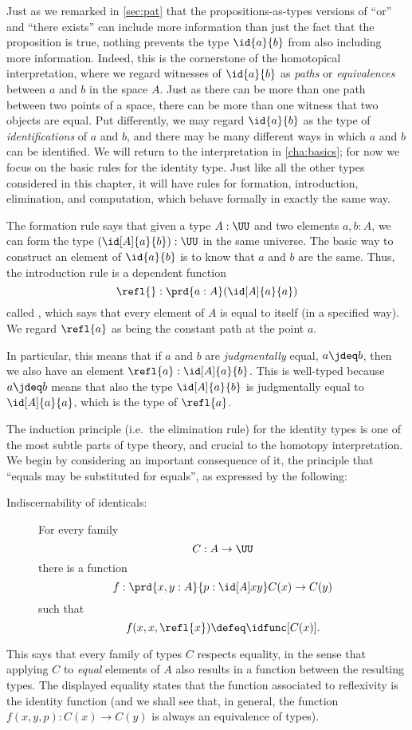 Just as we remarked in \cref{sec:pat} that the propositions-as-types versions of ``or'' and ``there exists'' can include more information than just the fact that the proposition is true, nothing prevents  the type $\id{a}{b}$ from also including more information.
Indeed, this is the cornerstone of the homotopical interpretation, where we regard witnesses of $\id{a}{b}$ as \emph{paths} or \emph{equivalences} between $a$ and $b$ in the space $A$.  Just as there can be more than one path between two points of a space, there can be more than one witness that two objects are equal.  Put differently, we may regard $\id{a}{b}$ as the type of \emph{identifications} of $a$ and $b$, and there may be many different ways in which $a$ and $b$ can be identified.
We will return to the interpretation in \cref{cha:basics}; for now we focus on the basic rules for the identity type.
Just like all the other types considered in this chapter, it will have rules for formation, introduction, elimination, and computation, which behave formally in exactly the same way.

The formation rule says that given a type $A:\UU$ and two elements $a,b:A$, we can form the type $(\id[A]{a}{b}):\UU$ in the same universe.
The basic way to construct an element of $\id{a}{b}$ is to know that $a$ and $b$ are the same.
Thus, the introduction rule is a dependent function
\[\refl{} : \prd{a:A} (\id[A]{a}{a})\]
called ,
%
which says that every element of $A$ is equal to itself (in a specified way).  We regard $\refl{a}$ as being the
constant path
at the point $a$.

In particular, this means that if $a$ and $b$ are \emph{judgmentally} equal, $a\jdeq b$, then we also have an element $\refl{a} : \id[A]{a}{b}$.
This is well-typed because $a\jdeq b$ means that also the type $\id[A]{a}{b}$ is judgmentally equal to $\id[A]{a}{a}$, which is the type of $\refl{a}$.

The induction principle (i.e.\ the elimination rule) for the identity types is one of the most subtle parts of type theory, and crucial to the homotopy interpretation.
We begin by considering an important consequence of it, the principle that ``equals may be substituted for equals'', as expressed by the following:
%
%
\begin{description}
\item[Indiscernability of identicals:]
For every family 
\[
C : A \to \UU
\]
there is a function
\[
f : \prd{x,y:A}{p:\id[A] x y} C(x) \to C(y)
\]
such that
\[
f(x,x,\refl{x}) \defeq \idfunc[C(x)].
\]
\end{description}
This says that every family of types $C$ respects equality, in the sense that applying $C$ to \emph{equal} elements of $A$ also results in a function between the resulting types. The displayed equality states that the function associated to reflexivity is the identity function (and we shall see that, in general, the function $f(x,y,p): C(x) \to C(y)$ is always an equivalence of types).

